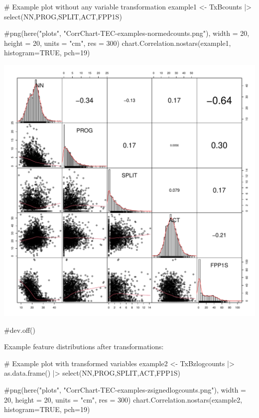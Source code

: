 \documentclass[
  letterpaper,
  DIV=11,
  numbers=noendperiod]{scrreprt}
\newenvironment{Shaded}{\begin{snugshade}}{\end{snugshade}}
\newcommand{\AttributeTok}[1]{\textcolor[rgb]{0.40,0.45,0.13}{#1}}
\newcommand{\CommentTok}[1]{\textcolor[rgb]{0.37,0.37,0.37}{#1}}
\newcommand{\ConstantTok}[1]{\textcolor[rgb]{0.56,0.35,0.01}{#1}}
\newcommand{\DecValTok}[1]{\textcolor[rgb]{0.68,0.00,0.00}{#1}}
\newcommand{\FunctionTok}[1]{\textcolor[rgb]{0.28,0.35,0.67}{#1}}
\newcommand{\NormalTok}[1]{\textcolor[rgb]{0.00,0.23,0.31}{#1}}
\newcommand{\OtherTok}[1]{\textcolor[rgb]{0.00,0.23,0.31}{#1}}
\newcommand{\SpecialCharTok}[1]{\textcolor[rgb]{0.37,0.37,0.37}{#1}}
\begin{document}
\begin{Shaded}
\begin{Highlighting}[]
\CommentTok{\# Example plot without any variable transformation}
\NormalTok{example1 }\OtherTok{\textless{}{-}}\NormalTok{ TxBcounts }\SpecialCharTok{|\textgreater{}} 
  \FunctionTok{select}\NormalTok{(NN,PROG,SPLIT,ACT,FPP1S)}

\CommentTok{\#png(here("plots", "CorrChart{-}TEC{-}examples{-}normedcounts.png"), width = 20, height = 20, units = "cm", res = 300)}
\FunctionTok{chart.Correlation.nostars}\NormalTok{(example1, }\AttributeTok{histogram=}\ConstantTok{TRUE}\NormalTok{, }\AttributeTok{pch=}\DecValTok{19}\NormalTok{)}
\end{Highlighting}
\end{Shaded}

\includegraphics{AppendixE_files/figure-pdf/example-correlation-plots-1.pdf}

\begin{Shaded}
\begin{Highlighting}[]
\CommentTok{\#dev.off()}
\end{Highlighting}
\end{Shaded}

Example feature distributions after transformations:

\begin{Shaded}
\begin{Highlighting}[]
\CommentTok{\# Example plot with transformed variables}
\NormalTok{example2 }\OtherTok{\textless{}{-}}\NormalTok{ TxBzlogcounts }\SpecialCharTok{|\textgreater{}} 
  \FunctionTok{as.data.frame}\NormalTok{() }\SpecialCharTok{|\textgreater{}}  
  \FunctionTok{select}\NormalTok{(NN,PROG,SPLIT,ACT,FPP1S)}

\CommentTok{\#png(here("plots", "CorrChart{-}TEC{-}examples{-}zsignedlogcounts.png"), width = 20, height = 20, units = "cm", res = 300)}
\FunctionTok{chart.Correlation.nostars}\NormalTok{(example2, }\AttributeTok{histogram=}\ConstantTok{TRUE}\NormalTok{, }\AttributeTok{pch=}\DecValTok{19}\NormalTok{)}
\end{Highlighting}
\end{Shaded}
\end{document}
